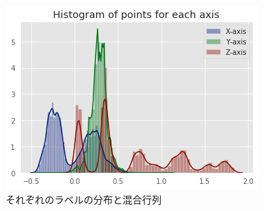 \begin{figure}[htbp]
\begin{center}
\includegraphics[width=\textwidth]{images/coordinate_hist.png}
\end{center}
\caption{それぞれのラベルの分布と混合行列}
\label{figure:coordinate_hist}
\end{figure}
